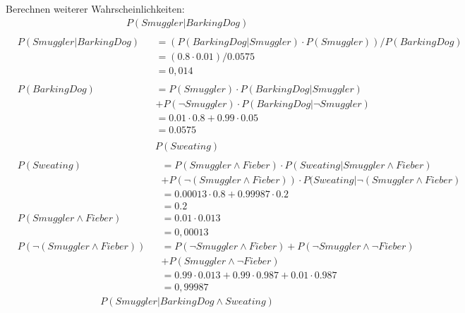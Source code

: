 \documentclass[ngerman]{fbi-aufgabenblatt}
\begin{document}
Berechnen weiterer Wahrscheinlichkeiten:
\begin{align*}
&P(Smuggler | BarkingDog)\\
\end{align*}
\begin{align*}
&P(Smuggler | BarkingDog) &&= (P(BarkingDog | Smuggler) \cdot P(Smuggler)) / P(BarkingDog) \\
& &&= (0.8 \cdot 0.01) / 0.0575\\
& &&= 0,014\\
&\\
&P(BarkingDog) &&= P(Smuggler) \cdot P(BarkingDog | Smuggler) \\
& &&   + P( \neg Smuggler) \cdot P(BarkingDog | \neg Smuggler) \\
& &&= 0.01 \cdot 0.8 + 0.99 \cdot 0.05 \\
& &&= 0.0575 \\
\end{align*}
\begin{align*}
&P(Sweating)\\
\end{align*}
\begin{align*}
&P(Sweating) &&= P(Smuggler \land Fieber) \cdot  P(Sweating | Smuggler \land Fieber)\\
& && + P(\neg(Smuggler \land Fieber)) \cdot  P(Sweating | \neg(Smuggler \land Fieber)\\
& &&= 0.00013 \cdot 0.8 + 0.99987 \cdot 0.2 \\
& &&= 0.2 \\
&P(Smuggler \land Fieber) &&= 0.01 \cdot 0.013 \\
& &&= 0,00013\\
& P(\neg(Smuggler \land Fieber)) &&= P(\neg Smuggler \land Fieber) + P(\neg Smuggler \land \neg Fieber) \\
& &&+P(Smuggler \land \neg Fieber) \\
& &&= 0.99 \cdot 0.013 + 0.99 \cdot 0.987 + 0.01 \cdot 0.987 \\
& &&= 0,99987
\end{align*}
\begin{align*}
&P(Smuggler | BarkingDog \land Sweating)\\
\end{align*}
\end{document}
